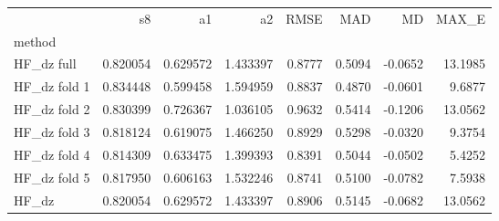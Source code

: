 \begin{tabular}{lrrrrrrr}
 & s8 & a1 & a2 & RMSE & MAD & MD & MAX_E \\
method &  &  &  &  &  &  &  \\
HF_dz full & 0.820054 & 0.629572 & 1.433397 & 0.8777 & 0.5094 & -0.0652 & 13.1985 \\
HF_dz fold 1 & 0.834448 & 0.599458 & 1.594959 & 0.8837 & 0.4870 & -0.0601 & 9.6877 \\
HF_dz fold 2 & 0.830399 & 0.726367 & 1.036105 & 0.9632 & 0.5414 & -0.1206 & 13.0562 \\
HF_dz fold 3 & 0.818124 & 0.619075 & 1.466250 & 0.8929 & 0.5298 & -0.0320 & 9.3754 \\
HF_dz fold 4 & 0.814309 & 0.633475 & 1.399393 & 0.8391 & 0.5044 & -0.0502 & 5.4252 \\
HF_dz fold 5 & 0.817950 & 0.606163 & 1.532246 & 0.8741 & 0.5100 & -0.0782 & 7.5938 \\
HF_dz & 0.820054 & 0.629572 & 1.433397 & 0.8906 & 0.5145 & -0.0682 & 13.0562 \\
\end{tabular}
